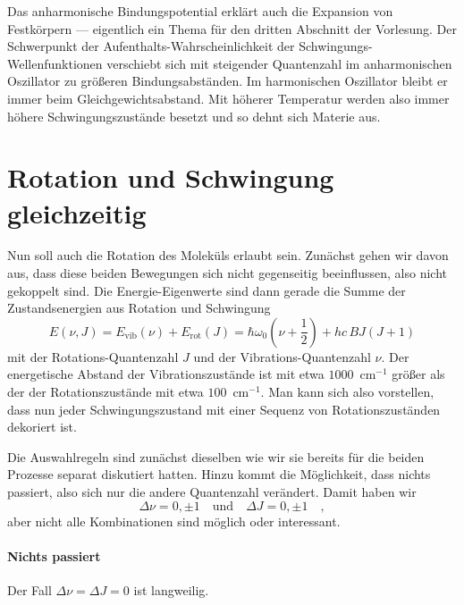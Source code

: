  
 
Das anharmonische Bindungspotential erklärt auch die Expansion von Festkörpern --- eigentlich ein Thema für den dritten Abschnitt der Vorlesung. Der Schwerpunkt der Aufenthalts-Wahrscheinlichkeit der Schwingungs-Wellenfunktionen verschiebt sich mit steigender Quantenzahl im anharmonischen Oszillator zu größeren Bindungsabständen. Im harmonischen Oszillator bleibt er immer beim Gleichgewichtsabstand. Mit höherer Temperatur werden also immer höhere Schwingungszustände besetzt und so dehnt sich Materie aus.


\section{Rotation und Schwingung gleichzeitig}

Nun soll auch die Rotation des Moleküls erlaubt sein. Zunächst gehen wir davon aus, dass diese beiden Bewegungen sich nicht gegenseitig beeinflussen, also nicht gekoppelt sind. Die Energie-Eigenwerte sind dann gerade die Summe der Zustandsenergien aus Rotation und Schwingung
\begin{equation}
E (\nu, J) = E_\text{vib}(\nu) + E_\text{rot}(J) = \hbar \omega_0 \left(\nu + \frac{1}{2} \right) + h c \, B J \left( J+1 \right) \label{eq:vib_rot_simple}
\end{equation}
mit der Rotations-Quantenzahl $J$ und der Vibrations-Quantenzahl $\nu$. Der energetische Abstand der Vibrationszustände ist mit etwa $1000$~cm$^{-1}$  größer als der der Rotationszustände mit etwa $100$~cm$^{-1}$. Man kann sich also vorstellen, dass nun jeder Schwingungszustand mit einer Sequenz von Rotationszuständen dekoriert ist.

Die Auswahlregeln sind zunächst dieselben wie wir sie bereits für die beiden Prozesse separat diskutiert hatten. Hinzu kommt die Möglichkeit, dass nichts passiert, also sich nur die andere Quantenzahl verändert. Damit haben wir
\begin{equation}
 \Delta \nu = 0, \pm 1 \quad \text{und} \quad \Delta J = 0, \pm 1  \quad ,
\end{equation}
aber nicht alle Kombinationen sind möglich oder interessant.

\paragraph{Nichts passiert} Der Fall $\Delta \nu = \Delta J = 0$ ist langweilig.

